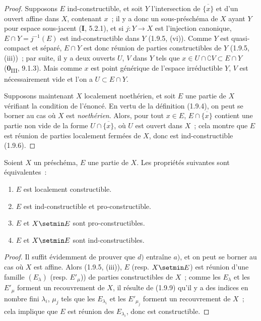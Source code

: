 \begin{proof}
Supposons $E$ ind-constructible, et soit $Y$ l'intersection de
$\overline{\{x\}}$ et d'un ouvert affine dans $X$, contenant $x$~; il y a
donc un sous-préschéma de $X$ ayant $Y$ pour espace sous-jacent (\textbf{I}, 5.2.1),
et si $j:Y\to X$ est l'injection canonique,
$E\cap Y=j^{-1}(E)$ est ind-constructible dans $Y$ (1.9.5, (vi)). Comme $Y$
est quasi-compact et séparé, $E\cap Y$ est donc réunion de parties
constructibles de $Y$ (1.9.5, (iii))~; par suite, il y a deux ouverts $U$,
$V$ dans $Y$ tels que
$x\in U\cap\complement V\subset E\cap Y$ (\textbf{0}\textsubscript{III}, 9.1.3).
Mais comme $x$ est point générique de l'espace irréductible $Y$, $V$ est
nécessairement vide et l'on a $U\subset E\cap Y$.

Supposons maintenant $X$ localement noethérien, et soit $E$ une partie de
$X$ vérifiant la condition de l'énoncé. En vertu de la définition (1.9.4),
on peut se borner au cas où $X$ est \emph{noethérien}. Alors, pour tout $x\in E$,
$E\cap\overline{\{x\}}$ contient une partie non vide de la forme
$U\cap\overline{\{x\}}$, où $U$ est ouvert dans $X$~; cela montre que $E$
est réunion de parties localement fermées de $X$, donc est
ind-constructible (1.9.6).
\end{proof}

\begin{proposition}[1.9.11]
\label{IV.1.9.11-fr}
Soient $X$ un préschéma, $E$ une partie de $X$. Les propriétés suivantes sont
équivalentes~:
\begin{enumerate}
  \item[a)] $E$ est localement constructible.
  \item[b)] $E$ est ind-constructible et pro-constructible.
  \item[c)] $E$ et $X\setmin E$ sont pro-constructibles.
  \item[d)] $E$ et $X\setmin E$ sont ind-constructibles.
\end{enumerate}
\end{proposition}

\begin{proof}
Il suffit évidemment de prouver que $d)$ entraîne $a)$, et on peut se borner
au cas où $X$ est affine. Alors (1.9.5, (iii)), $E$ (resp. $X\setmin E$) est réunion
d'une famille $(E_\lambda)$ (resp. $E'_\mu$)) de parties constructibles de
$X$~; comme les $E_\lambda$ et les $E'_\mu$ forment un recouvrement de $X$,
il résulte de (1.9.9) qu'il y a des indices en nombre fini $\lambda_i$,
$\mu_j$ tels que les $E_{\lambda_i}$ et les $E'_{\mu_j}$ forment un
recouvrement de $X$~; cela implique que $E$ est réunion des
$E_{\lambda_i}$, donc est constructible.
\end{proof}


